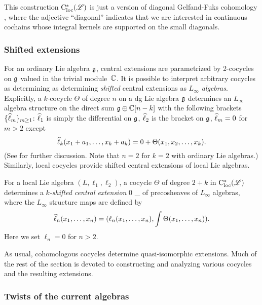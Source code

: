\begin{rmk}
This construction $\cloc^*(\sL)$ is just a version of diagonal Gelfand-Fuks cohomology \cite{Fuks, LosikDiag},
where the adjective ``diagonal'' indicates that we are interested in continuous cochains whose integral kernels are supported on the small diagonals.
\end{rmk}

\subsubsection{Shifted extensions}

For an ordinary Lie algebra $\fg$, central extensions are parametrized by 2-cocycles on $\fg$ valued in the trivial module~$\CC$. 
It is possible to interpret arbitrary cocycles as determining as determining {\em shifted} central extensions as {\em $L_\infty$ algebras}.
Explicitly, a $k$-cocycle $\Theta$ of degree $n$ on a dg Lie algebra $\fg$ determines an $L_\infty$ algebra structure on the direct sum $\fg \oplus \CC[n-k]$ with the following brackets $\{\Hat{\ell}_m\}_{m \geq 1}$: $\Hat{\ell}_1$ is simply the differential on $\fg$, $\Hat{\ell}_2$ is the bracket on $\fg$, $\Hat{\ell}_m = 0$ for $m >2$ except
\[
\Hat{\ell}_k(x_1 + a_1, \ldots, x_k + a_k) = 0+ \Theta(x_1,x_2,\ldots, x_k).
\]
(See \cite{KonSoi} for further discussion. Note that $n=2$ for $k=2$ with ordinary Lie algebras.)
Similarly, local cocycles provide shifted central extensions of local Lie algebras.

\begin{dfn}
For a local Lie algebra $(L, \ell_1,\ell_2)$, a cocycle $\Theta$ of degree $2+k$ in $\cloc^*(\sL)$ determines a {\em $k$-shifted central extension}
\beqn\label{kext}
0 \to \CC[k] \to \Hat{\sL}_\Theta \to \sL {}
\eeqn
of precosheaves of $L_\infty$ algebras, where the $L_\infty$ structure maps are defined by
\[
\Hat{\ell}_n(x_1,\ldots,x_n) = (\ell_n(x_1,\ldots,x_n), \int \Theta(x_1,\ldots,x_n)).
\]
Here we set $\ell_n = 0$ for $n > 2$.
\end{dfn}

As usual, cohomologous cocycles determine quasi-isomorphic extensions. 
Much of the rest of the section is devoted to constructing and analyzing various cocycles and the resulting extensions.

\subsubsection{Twists of the current algebras}


